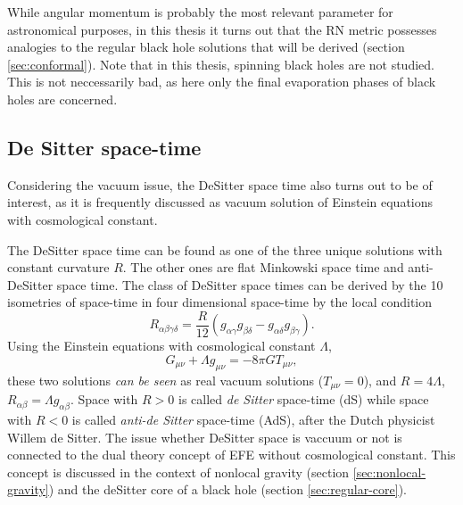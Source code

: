 \documentclass[12pt,a4paper]{report}
\numberwithin{equation}{chapter}
\begin{document}
While angular momentum is probably the most relevant parameter for astronomical purposes, in this thesis it turns out that the RN metric possesses analogies to the regular black hole solutions that will be derived (section \ref{sec:conformal}). Note that in this thesis, spinning black holes are not studied. This is not neccessarily bad, as here only the final evaporation phases of black holes are concerned.

\subsection{De Sitter space-time}\label{sec:deSitter-intro}
Considering the vacuum issue, the DeSitter space time also turns out to be of interest, as it is frequently discussed as vacuum solution of Einstein equations with cosmological constant.

The DeSitter space time can be found as one of the three unique solutions with constant curvature $R$. The other ones are flat Minkowski space time and anti-DeSitter space time. The class of DeSitter space times can be derived by the 10 isometries of space-time in four dimensional space-time by the local condition \cite{griffiths2009exact}
\begin{equation}
R_{\alpha \beta \gamma \delta} = \frac{R}{12} (
g_{\alpha \gamma} g_{\beta \delta} -
g_{\alpha \delta} g_{\beta \gamma} ).
\end{equation}
Using the Einstein equations with cosmological constant $\Lambda$,
\begin{equation}
G_{\mu\nu} + \Lambda g_{\mu\nu} = -8\pi G T_{\mu\nu},
\end{equation}
these two solutions \emph{can be seen} as real vacuum solutions ($T_{\mu\nu}=0$), and $R=4\Lambda$, $R_{\alpha\beta} = \Lambda g_{\alpha \beta}$. Space with $R>0$ is called \emph{de Sitter} space-time (dS) while space with $R<0$ is called \emph{anti-de Sitter} space-time (AdS), after the Dutch physicist Willem de Sitter. The issue whether DeSitter space is vaccuum or not is connected to the dual theory concept of EFE without cosmological constant. This concept is discussed in the context of nonlocal gravity (section \ref{sec:nonlocal-gravity}) and the deSitter core of a black hole (section \ref{sec:regular-core}).
\end{document}
